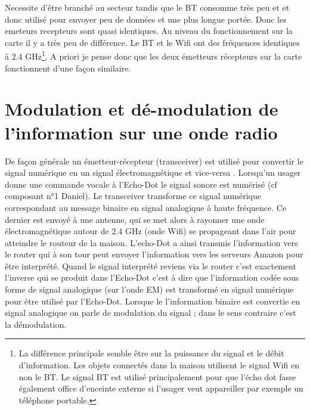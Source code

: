 \documentclass[12pt,svgnames]{article}
\begin{document}
   
Necessite d'être branché au secteur tandis que le BT consomme très peu et et donc utilisé pour envoyer peu de données et une plus longue portée.
Donc les emeteurs recepteurs sont quasi identiques. Au niveau du fonctionnement sur la carte il y a très peu de différence.
Le BT et le Wifi ont des fréquences identiques à 2.4 GHz\footnote{La différence principale semble être sur la puissance du signal et le débit d'information. Les objets connectés dans la maison utilisent le signal Wifi en non le BT. Le signal BT est utilisé principalement pour que l'écho dot fasse également office d'enceinte externe si l'usager veut appareiller par exemple un téléphone portable.}. A priori je pense donc que les deux émetteurs récepteurs sur la carte fonctionnent d'une façon similaire.

\section{Modulation et dé-modulation de l'information sur une onde radio}
 
De façon générale un émetteur-récepteur (transceiver) est utilisé pour convertir le signal numérique en un signal électromagnétique et vice-versa \cite{medium}. 
Lorsqu'un usager donne une commande vocale à l'Echo-Dot le signal sonore est numérisé (cf composant n°1 Daniel). Le transceiver transforme ce signal numérique correspondant au message binaire en signal analogique à haute fréquence. Ce dernier est envoyé à une antenne, qui se met alors à rayonner une onde électromagnétique autour de 2.4 GHz (onde Wifi) se propageant dans l’air pour atteindre le routeur de la maison. L'echo-Dot a ainsi transmis l'information vers le router qui à son tour peut envoyer l'information vers les serveurs Amazon pour être interprété. Quand le signal interprété reviens via le router c'est exactement l'inverse qui se produit dans l'Echo-Dot c'est à dire que l'information codée sous forme de signal analogique (sur l'onde EM) est transformé en signal numérique pour être utilisé par l'Echo-Dot. Lorsque le l'information binaire est convertie en signal analogique on parle de modulation du signal ; dans le sens contraire c'est la démodulation.

\end{document}
